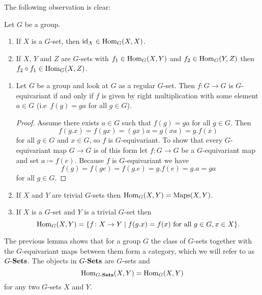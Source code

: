 The following observation is clear:


\begin{lem}
  Let $G$ be a group.
  \begin{enumerate}[label=\emph{\alph*)},leftmargin=*]
    \item
      If $X$ is a $G$-set, then $\operatorname{id}_X \in \operatorname{Hom}_G(X,X)$.
    \item
      If $X$, $Y$ and $Z$ are $G$-sets with $f_1 \in \operatorname{Hom}_G(X,Y)$ and $f_2 \in \operatorname{Hom}_G(Y,Z)$ then $f_2 \circ f_1 \in \operatorname{Hom}_G(X,Z)$.
  \end{enumerate}
\end{lem}


\begin{expls}
  \begin{enumerate}[label=\emph{\alph*)},leftmargin=*]
    \item
      Let $G$ be a group and look at $G$ as a regular $G$-set.
      Then $f \colon G \to G$ is $G$-equivariant if and only if $f$ is given by right multiplication with some element $a \in G$ (i.e\ $f(g) = ga$ for all $g \in G$).
      \begin{proof}
        Assume there exists $a \in G$ such that $f(g) = ga$ for all $g \in G$.
        Then
        \[
            f(g.x)
          = f(gx)
          = (gx)a
          = g(xa)
          = g.f(x)
        \]
        for all $g \in G$ and $x \in G$, so $f$ is $G$-equivariant.
        To show that every $G$-equivariant map $G \to G$ is of this form let $f \colon G \to G$ be a $G$-equivariant map and set $a \coloneqq f(e)$.
        Because $f$ is $G$-equivariant we have
        \[
            f(g)
          = f(ge)
          = f(g.e)
          = g.f(e)
          = g.a
          = ga
        \]
        for all $g \in G$.
      \end{proof}
    \item
      If $X$ and $Y$ are trivial $G$-sets then $\operatorname{Hom}_G(X,Y) = \operatorname{Maps}(X,Y)$.
    \item
      If $X$ is a $G$-set and $Y$ is a trivial $G$-set then
      \[
          \operatorname{Hom}_G(X,Y)
        = \{
            f \colon X \to Y
          \mid
              f(g.x)
            = f(x)
            \text{ for all }
            g \in G, x \in X
          \}.
      \]
  \end{enumerate}
\end{expls}


The previous lemma shows that for a group $G$ the class of $G$-sets together with the $G$-equivariant maps between them form a category, which we will refer to as $G\text{-}\mathbf{Sets}$.
The objects in $G\text{-}\mathbf{Sets}$ are $G$-sets and
\[
    \operatorname{Hom}_{G\text{-}\mathbf{Sets}}(X,Y)
  = \operatorname{Hom}_G(X,Y)
\]
for any two $G$-sets $X$ and $Y$.


